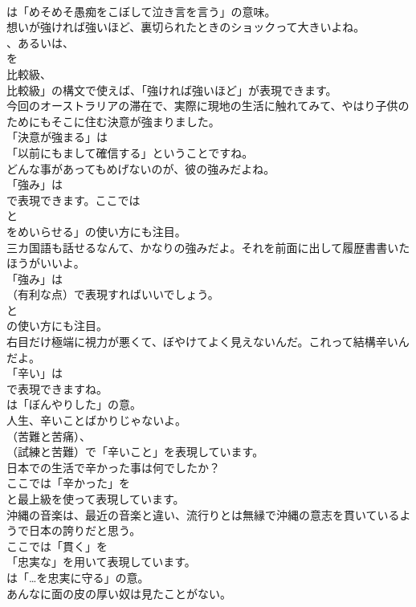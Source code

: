 \documentclass[8pt]{extreport}
\begin{document}
\begin{CJK}{UTF8}{min}
\\	は「めそめそ愚痴をこぼして泣き言を言う」の意味。	
\\	想いが強ければ強いほど、裏切られたときのショックって大きいよね。 
\\	、あるいは、
\\	を
\\	比較級、
\\	比較級」の構文で使えば、「強ければ強いほど」が表現できます。	
\\	今回のオーストラリアの滞在で、実際に現地の生活に触れてみて、やはり子供のためにもそこに住む決意が強まりました。 
\\	「決意が強まる」は
\\	「以前にもまして確信する」ということですね。	
\\	どんな事があってもめげないのが、彼の強みだよね。 
\\	「強み」は
\\	で表現できます。ここでは
\\	と
\\	をめいらせる」の使い方にも注目。	
\\	三カ国語も話せるなんて、かなりの強みだよ。それを前面に出して履歴書書いたほうがいいよ。 
\\	「強み」は 
\\	（有利な点）で表現すればいいでしょう。
\\	と 
\\	の使い方にも注目。	
\\	右目だけ極端に視力が悪くて、ぼやけてよく見えないんだ。これって結構辛いんだよ。 
\\	「辛い」は 
\\	で表現できますね。
\\	は「ぼんやりした」の意。	
\\	人生、辛いことばかりじゃないよ。 
\\	（苦難と苦痛）、
\\	（試練と苦難）で「辛いこと」を表現しています。	
\\	日本での生活で辛かった事は何でしたか？ 
\\	ここでは「辛かった」を
\\	と最上級を使って表現しています。	
\\	沖縄の音楽は、最近の音楽と違い、流行りとは無縁で沖縄の意志を貫いているようで日本の誇りだと思う。 
\\	ここでは「貫く」を
\\	「忠実な」を用いて表現しています。
\\	は「…を忠実に守る」の意。	
\\	あんなに面の皮の厚い奴は見たことがない。 

\end{CJK}
\end{document}
